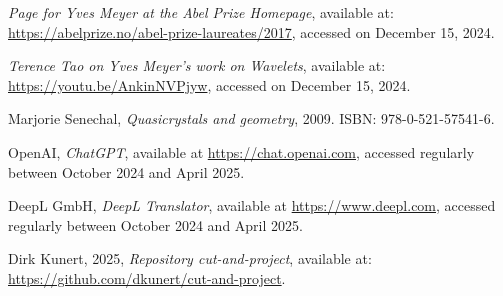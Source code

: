 \documentclass[11pt]{article}
\theoremstyle{remark}
\begin{document}
\begin{thebibliography}{99}

\emph{Page for Yves Meyer at the Abel Prize Homepage},
available at: \url{https://abelprize.no/abel-prize-laureates/2017}, accessed on December 15, 2024.

\emph{Terence Tao on Yves Meyer's work on Wavelets},
available at: \url{https://youtu.be/AnkinNVPjyw}, accessed on December 15, 2024.

Marjorie Senechal,
\emph{Quasicrystals and geometry},
2009.
ISBN: 978-0-521-57541-6.

OpenAI, \emph{ChatGPT}, available at \url{https://chat.openai.com}, accessed regularly between October 2024 and April 2025.

DeepL GmbH, \emph{DeepL Translator}, available at \url{https://www.deepl.com}, accessed regularly between October 2024 and April 2025.

Dirk Kunert, 2025,
\emph{Repository \emph{cut-and-project}},
available at: \url{https://github.com/dkunert/cut-and-project}.

\end{thebibliography}
\end{document}
